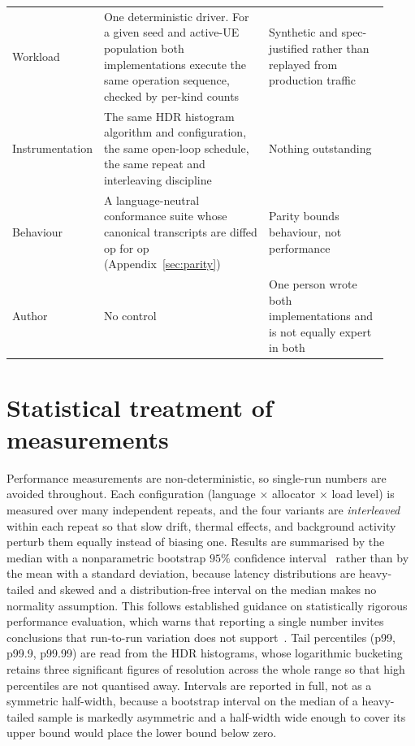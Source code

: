 \documentclass[english,oneside,a4paper,censored,csm,software-track-2020]{HYthesisML}
\begin{document}
\begin{appendices}
\begin{table}[H]
\begin{tabular}{@{}R{0.16\linewidth} R{0.44\linewidth} R{0.32\linewidth}@{}}
Workload & One deterministic driver. For a given seed and active-UE population both implementations execute the same operation sequence, checked by per-kind counts & Synthetic and spec-justified rather than replayed from production traffic \\
Instrumentation & The same HDR histogram algorithm and configuration, the same open-loop schedule, the same repeat and interleaving discipline & Nothing outstanding \\
Behaviour & A language-neutral conformance suite whose canonical transcripts are diffed op for op (Appendix~\ref{sec:parity}) & Parity bounds behaviour, not performance \\
\hline
Author & No control & One person wrote both implementations and is not equally expert in both \\
\hline
\end{tabular}
\end{table}


\section{Statistical treatment of measurements}\label{sec:stats}
Performance measurements are non-deterministic, so single-run numbers are avoided throughout.
Each configuration (language $\times$ allocator $\times$ load level) is measured over many
independent repeats, and the four variants are \emph{interleaved} within each repeat so that
slow drift, thermal effects, and background activity perturb them equally instead of biasing
one. Results are summarised by the median with a nonparametric bootstrap $95\%$ confidence
interval~\cite{efron1993bootstrap} rather than by the mean with a standard deviation, because
latency distributions are
heavy-tailed and skewed and a distribution-free interval on the median makes no normality
assumption. This follows established guidance on statistically rigorous performance evaluation,
which warns that reporting a single number invites conclusions that run-to-run variation does
not support~\cite{georges2007rigorous}. Tail percentiles (p99, p99.9, p99.99) are read from the
HDR histograms, whose logarithmic bucketing retains three significant figures of resolution
across the whole range so that high percentiles are not quantised away. Intervals are reported
in full, not as a symmetric half-width, because a bootstrap interval on the median of a
heavy-tailed sample is markedly asymmetric and a half-width wide enough to cover its upper
bound would place the lower bound below zero.


\end{appendices}
\end{document}
